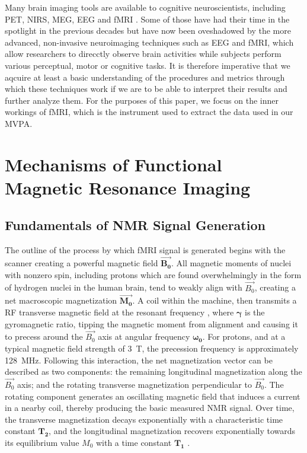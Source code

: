 Many brain imaging tools are available to cognitive neuroscientists, including \gls{PET}, \gls{NIRS}, \gls{MEG}, \gls{EEG} and \gls{fMRI} \cite{Xue2010}. Some of those have had their time in the spotlight in the previous decades but have now been oveshadowed by the more advanced, non-invasive neuroimaging techniques such as \gls{EEG} and \gls{fMRI}, which allow researchers to direcctly observe brain activities while subjects perform various perceptual, motor or cognitive tasks. It is therefore imperative that we aqcuire at least a basic understanding of the procedures and metrics through which these techniques work if we are to be able to interpret their results and further analyze them. For the purposes of this paper, we focus on the inner workings of \gls{fMRI}, which is the instrument used to extract the data used in our \gls{MVPA}.

\section{Mechanisms of Functional Magnetic Resonance Imaging}

\subsection{Fundamentals of NMR Signal Generation}

The outline of the process by which \gls{fMRI} signal is generated begins with the scanner creating a powerful magnetic field  \( \vec{\boldsymbol{B_0}} \). All magnetic moments of nuclei with nonzero spin, including protons which are found overwhelmingly in the form of hydrogen nuclei in the human brain, tend to weakly align with \( \vec{B_0} \), creating a net macroscopic magnetization \( \vec{\boldsymbol{M_0}} \). A coil within the machine, then transmits a \gls{RF} transverse magnetic field at the resonant frequency , where \( \boldsymbol{\gamma} \) is the \gls{gyromagnetic ratio}, tipping the magnetic moment from alignment and causing it to precess around the \( \vec{B_0} \) axis at angular frequency \( \boldsymbol{\omega_0} \). For protons,  and at a typical magnetic field strength of \SI{3}{\tesla}, the precession frequency  is approximately \SI{128}{\mega\hertz}. Following this interaction, the net magnetization vector can be described as two components: the remaining longitudinal magnetization along the \( \vec{B_0} \) axis; and the rotating transverse magnetization perpendicular to \( \vec{B_0} \). The rotating component generates an oscillating magnetic field that induces a current in a nearby coil, thereby producing the basic measured \gls{NMR} signal. Over time, the transverse magnetization decays exponentially with a characteristic time constant \( \boldsymbol{T_2} \), and the longitudinal magnetization recovers exponentially towards its equilibrium value \( M_0 \) with a time constant \( \boldsymbol{T_1} \) \cite{Buxton2013, Suriaga2009}.

